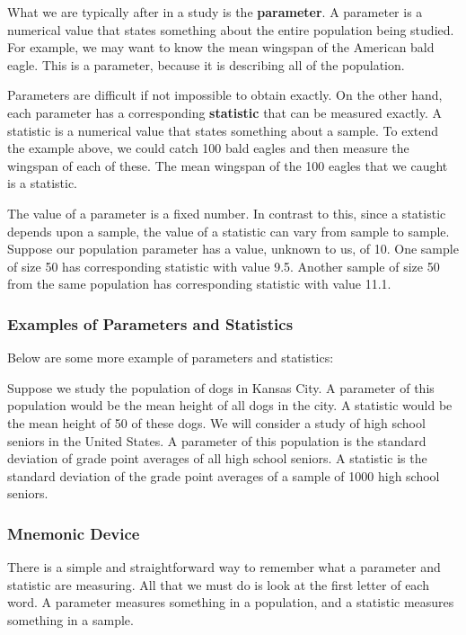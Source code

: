 What we are typically after in a study is the \textbf{parameter}. A parameter is a numerical value that states something about the entire population being studied. For example, we may want to know the mean wingspan of the American bald eagle. This is a parameter, because it is describing all of the population.

Parameters are difficult if not impossible to obtain exactly. On the other hand, each parameter has a corresponding \textbf{statistic} that can be measured exactly. A statistic is a numerical value that states something about a sample. To extend the example above, we could catch 100 bald eagles and then measure the wingspan of each of these. The mean wingspan of the 100 eagles that we caught is a statistic.

The value of a parameter is a fixed number. In contrast to this, since a statistic depends upon a sample, the value of a statistic can vary from sample to sample. Suppose our population parameter has a value, unknown to us, of 10. One sample of size 50 has corresponding statistic with value 9.5. Another sample of size 50 from the same population has corresponding statistic with value 11.1.

\subsubsection*{Examples of Parameters and Statistics}

Below are some more example of parameters and statistics:

Suppose we study the population of dogs in Kansas City. A parameter of this population would be the mean height of all dogs in the city. A statistic would be the mean height of 50 of these dogs.
We will consider a study of high school seniors in the United States. A parameter of this population is the standard deviation of grade point averages of all high school seniors. A statistic is the standard deviation of the grade point averages of a sample of 1000 high school seniors.

\subsubsection*{Mnemonic Device}

There is a simple and straightforward way to remember what a parameter and statistic are measuring. All that we must do is look at the first letter of each word. A parameter measures something in a population, and a statistic measures something in a sample.

